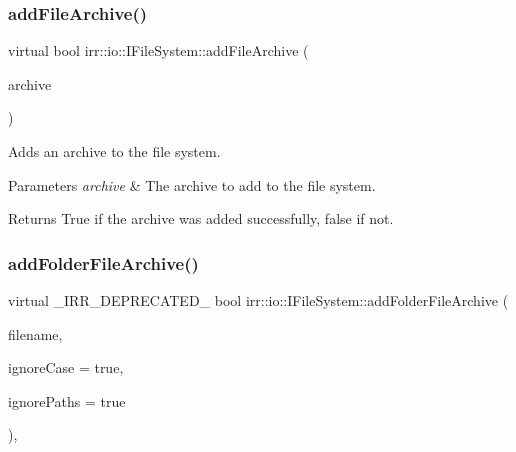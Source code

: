 \subsubsection{\texorpdfstring{add\+File\+Archive()}{addFileArchive()}\hspace{0.1cm}{\footnotesize\ttfamily [3/3]}}
{\footnotesize\ttfamily virtual bool irr\+::io\+::\+I\+File\+System\+::add\+File\+Archive (\begin{DoxyParamCaption}\item[{\hyperlink{classirr_1_1io_1_1IFileArchive}{I\+File\+Archive} $\ast$}]{archive }\end{DoxyParamCaption})\hspace{0.3cm}{\ttfamily [pure virtual]}}



Adds an archive to the file system. 


\begin{DoxyParams}{Parameters}
{\em archive} & The archive to add to the file system. \\
\hline
\end{DoxyParams}
\begin{DoxyReturn}{Returns}
True if the archive was added successfully, false if not. 
\end{DoxyReturn}
\mbox{\label{classirr_1_1io_1_1IFileSystem_a7b5235a1473ff67d97f1487211762723}} 
\subsubsection{\texorpdfstring{add\+Folder\+File\+Archive()}{addFolderFileArchive()}}
{\footnotesize\ttfamily virtual \+\_\+\+I\+R\+R\+\_\+\+D\+E\+P\+R\+E\+C\+A\+T\+E\+D\+\_\+ bool irr\+::io\+::\+I\+File\+System\+::add\+Folder\+File\+Archive (\begin{DoxyParamCaption}\item[{const \hyperlink{namespaceirr_a9395eaea339bcb546b319e9c96bf7410}{c8} $\ast$}]{filename,  }\item[{bool}]{ignore\+Case = {\ttfamily true},  }\item[{bool}]{ignore\+Paths = {\ttfamily true} }\end{DoxyParamCaption})\hspace{0.3cm}{\ttfamily [inline]}, {\ttfamily [virtual]}}



